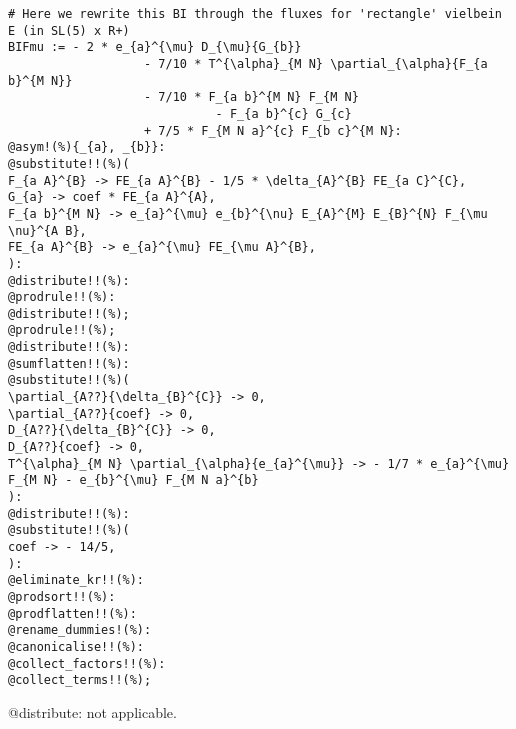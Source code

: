 \documentclass[11pt]{article}
\begin{document}
{\color[named]{Blue}\begin{verbatim}
# Here we rewrite this BI through the fluxes for 'rectangle' vielbein E (in SL(5) x R+)
BIFmu := - 2 * e_{a}^{\mu} D_{\mu}{G_{b}} 
                   - 7/10 * T^{\alpha}_{M N} \partial_{\alpha}{F_{a b}^{M N}}
                   - 7/10 * F_{a b}^{M N} F_{M N}
                             - F_{a b}^{c} G_{c}
                   + 7/5 * F_{M N a}^{c} F_{b c}^{M N}:
@asym!(%){_{a}, _{b}}:
@substitute!!(%)(
F_{a A}^{B} -> FE_{a A}^{B} - 1/5 * \delta_{A}^{B} FE_{a C}^{C},
G_{a} -> coef * FE_{a A}^{A},
F_{a b}^{M N} -> e_{a}^{\mu} e_{b}^{\nu} E_{A}^{M} E_{B}^{N} F_{\mu \nu}^{A B},
FE_{a A}^{B} -> e_{a}^{\mu} FE_{\mu A}^{B},
):
@distribute!!(%):
@prodrule!!(%):
@distribute!!(%);
@prodrule!!(%);
@distribute!!(%):
@sumflatten!!(%):
@substitute!!(%)(
\partial_{A??}{\delta_{B}^{C}} -> 0,
\partial_{A??}{coef} -> 0,
D_{A??}{\delta_{B}^{C}} -> 0,
D_{A??}{coef} -> 0,
T^{\alpha}_{M N} \partial_{\alpha}{e_{a}^{\mu}} -> - 1/7 * e_{a}^{\mu} F_{M N} - e_{b}^{\mu} F_{M N a}^{b}
):
@distribute!!(%):
@substitute!!(%)(
coef -> - 14/5,
):
@eliminate_kr!!(%):
@prodsort!!(%):
@prodflatten!!(%):
@rename_dummies!(%):
@canonicalise!!(%):
@collect_factors!!(%):
@collect_terms!!(%);
\end{verbatim}}
@distribute: not applicable.
\end{document}
